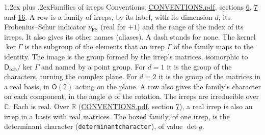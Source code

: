 \documentclass[10pt,a4paper]{article}
\makeatletter
\renewcommand\section{\@startsection{section}{1}{\z@}{-3ex plus -1ex minus -.2ex}%
  {1.2ex plus .2ex}{\normalfont\large\sffamily\bfseries\color{parttitle}}}
\numberwithin{equation}{section}
\newcommand{\grp}[1]{\mathsf{#1}}
\newcommand{\fsind}{\nu_{\mathrm{FS}}}
\makeatother
\begin{document}
\section{Families of irreps}\label{s:families}
Conventions: \href{../../CONVENTIONS.pdf}{CONVENTIONS.pdf}, sections \href{../../CONVENTIONS.pdf\#conv.6}{6}, \href{../../CONVENTIONS.pdf\#conv.7}{7} and \href{../../CONVENTIONS.pdf\#conv.16}{16}.
\leavevmode\label{n:index.dimension}\label{n:index.frobenius}\label{n:index.family}\label{n:head.family.irreps}\label{n:head.index.family}A row is a family of irreps, by its label, with its dimension $d$, its Frobenius--Schur indicator $\fsind$ (real for $+1$) and the range of the index of its irreps. \label{n:head.aliases}\label{n:irrep.alias.greek}It also gives its other names (aliases). A dash stands for none. \label{n:irrep.Gamma}\label{n:head.kernel}The kernel $\ker\Gamma$ is the subgroup of the elements that an irrep $\Gamma$ of the family maps to the identity. \label{n:head.image}The image is the group formed by the irrep's matrices, isomorphic to $\grp{D_{\infty h}}/\ker\Gamma$ and named by a point group. For $d = 1$ it is the group of the characters, turning the complex plane. For $d = 2$ it is the group of the matrices in a real basis, in $\grp{O(2)}$ acting on the plane. A row also gives the family's character on each component, in the angle $\phi$ of the rotation. The irreps are irreducible over $\mathbb{C}$. Each is real. Over $\mathbb{R}$ (\href{../../CONVENTIONS.pdf}{CONVENTIONS.pdf}, section \href{../../CONVENTIONS.pdf\#conv.7}{7}), a real irrep is also an irrep in a basis with real matrices. \label{n:mark.determinant}The boxed family, of one irrep, is the determinant character (\texttt{determinantcharacter}), of value $\det g$.
\end{document}
